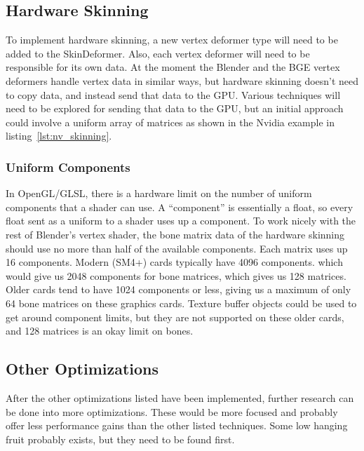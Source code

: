 \documentclass[]{article}
\begin{document}
\subsection{Hardware Skinning}
\label{sec:hardware_skinning}

To implement hardware skinning, a new vertex deformer type will need to be added to the SkinDeformer. Also, each vertex deformer will need to be responsible for its own data. At the moment the Blender and the BGE vertex deformers handle vertex data in similar ways, but hardware skinning doesn't need to copy data, and instead send that data to the GPU. Various techniques will need to be explored for sending that data to the GPU, but an initial approach could involve a uniform array of matrices as shown in the Nvidia example in listing~\ref{lst:nv_skinning}.

\subsubsection{Uniform Components}

In OpenGL/GLSL, there is a hardware limit on the number of uniform components that a shader can use. A ``component'' is essentially a float, so every float sent as a uniform to a shader uses up a component. To work nicely with the rest of Blender's vertex shader, the bone matrix data of the hardware skinning should use no more than half of the available components. Each matrix uses up 16 components. Modern (SM4+) cards typically have 4096 components. which would give us 2048 components for bone matrices, which gives us 128 matrices. Older cards tend to have 1024 components or less, giving us a maximum of only 64 bone matrices on these graphics cards. Texture buffer objects could be used to get around component limits, but they are not supported on these older cards, and 128 matrices is an okay limit on bones.

\subsection{Other Optimizations}

After the other optimizations listed have been implemented, further research can be done into more optimizations. These would be more focused and probably offer less performance gains than the other listed techniques. Some low hanging fruit probably exists, but they need to be found first.


\clearpage



\end{document}
